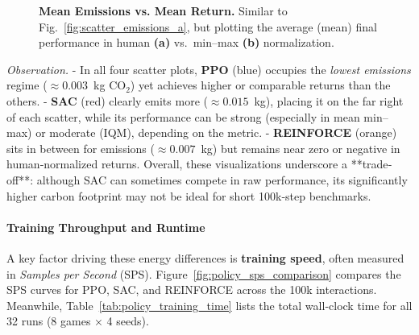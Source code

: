\begin{figure} 
	\centering
	\quad
	\caption{\textbf{Mean Emissions vs. Mean Return.}
		Similar to Fig.~\ref{fig:scatter_emissions_a}, but plotting the average (mean) final performance in human \textbf{(a)} vs.\ min--max \textbf{(b)} normalization.}
	\label{fig:scatter_emissions_b}
\end{figure}

\noindent
\emph{Observation.} 
- In all four scatter plots, \textbf{PPO} (blue) occupies the \emph{lowest emissions} regime (\(\approx 0.003\)~kg CO$_2$) yet achieves higher or comparable returns than the others. 
- \textbf{SAC} (red) clearly emits more (\(\approx 0.015\)~kg), placing it on the far right of each scatter, while its performance can be strong (especially in mean min–max) or moderate (IQM), depending on the metric. 
- \textbf{REINFORCE} (orange) sits in between for emissions (\(\approx 0.007\)~kg) but remains near zero or negative in human‐normalized returns. 
Overall, these visualizations underscore a **trade‐off**: although SAC can sometimes compete in raw performance, its significantly higher carbon footprint may not be ideal for short 100k‐step benchmarks.

\paragraph{Training Throughput and Runtime}
A key factor driving these energy differences is \textbf{training speed}, often measured in \emph{Samples per Second} (SPS). Figure~\ref{fig:policy_sps_comparison} compares the SPS curves for PPO, SAC, and REINFORCE across the 100k interactions. Meanwhile, Table~\ref{tab:policy_training_time} lists the total wall‐clock time for all 32 runs (8 games × 4 seeds).

